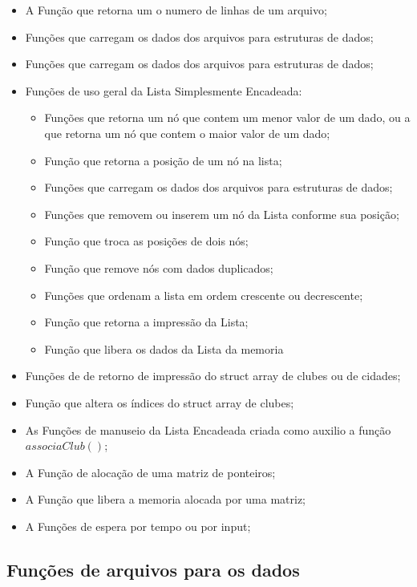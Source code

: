 \documentclass[12pt,a4paper]{article}
\begin{document}
\begin{itemize}
	\setlength\itemsep{1pt}
	\item A Função que retorna um o numero de linhas de um arquivo;
	\item Funções que carregam os dados dos arquivos para estruturas de dados;
	\item Funções que carregam os dados dos arquivos para estruturas de dados;
	\item Funções de uso geral da Lista Simplesmente Encadeada:
	\begin{itemize}
		\setlength\itemsep{1pt}
		\item Funções que retorna um nó que contem um menor valor de um dado, ou a que retorna um nó que contem o maior valor de um dado;
		\item Função que retorna a posição de um nó na lista;
		\item Funções que carregam os dados dos arquivos para estruturas de dados;
		\item Funções que removem ou inserem um nó da Lista conforme sua posição;
		\item Função que troca as posições de dois nós;
		\item Função que remove nós com dados duplicados;
		\item Funções que ordenam a lista em ordem crescente ou decrescente;
		\item Função que retorna a impressão da Lista;
		\item Função que libera os dados da Lista da memoria
	\end{itemize}
	\item Funções de de retorno de impressão do struct array de clubes ou de cidades;
	\item Função que altera os índices do struct array de clubes;
	\item As Funções de manuseio da Lista Encadeada criada como auxilio a função $associaClub()$;
	\item A Função de alocação de uma matriz de ponteiros;
	\item A Função que libera a memoria alocada por uma matriz;
	\item A Funções de espera por tempo ou por input;
\end{itemize}

\subsection{Funções de arquivos para os dados}
\end{document}
